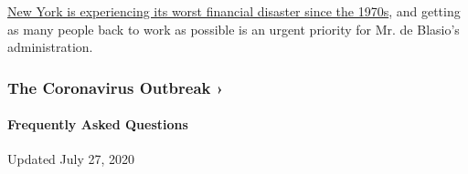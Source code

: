 \href{https://www.nytimes.com/2020/07/07/nyregion/nyc-unemployment.html}{New
York is experiencing its worst financial disaster since the 1970s}, and
getting as many people back to work as possible is an urgent priority
for Mr. de Blasio's administration.

\href{https://www.nytimes.com/news-event/coronavirus?action=click\&pgtype=Article\&state=default\&region=MAIN_CONTENT_3\&context=storylines_faq}{}

\hypertarget{the-coronavirus-outbreak-}{%
\subsubsection{The Coronavirus Outbreak
›}\label{the-coronavirus-outbreak-}}

\hypertarget{frequently-asked-questions}{%
\paragraph{Frequently Asked
Questions}\label{frequently-asked-questions}}

Updated July 27, 2020

